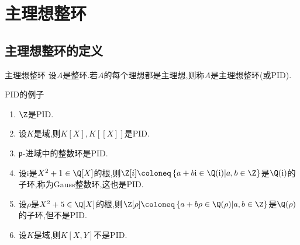 \chapter{主理想整环}

\section{主理想整环的定义}

\begin{definition}{主理想整环}{}
	设$A$是整环.若$A$的每个理想都是主理想,则称$A$是主理想整环(或PID).
\end{definition}

\begin{example}{PID的例子}{}
	\begin{enumerate}
		\item $\Z$是PID.
		\item 设$K$是域,则$K[X],K[[X]]$是PID.
		\item $\mathfrak{p}$-进域中的整数环是PID.
		\item 设$\mathrm{i}$是$X^{2}+1\in\Q[X]$的根,则$\Z[i]\coloneq\left\{a+b\mathrm{i}\in\Q(\mathrm{i})\middle|a,b\in\Z\right\}$是$\Q(\mathrm{i})$的子环,称为Gauss整数环,这也是PID.
		\item 设$\rho$是$X^{2}+5\in\Q[X]$的根,则$\Z[\rho]\coloneq\left\{a+b\rho\in\Q(\rho)\middle|a,b\in\Z\right\}$是$\Q(\rho)$的子环,但不是PID.
		\item 设$K$是域,则$K[X,Y]$不是PID.
	\end{enumerate}
\end{example}
